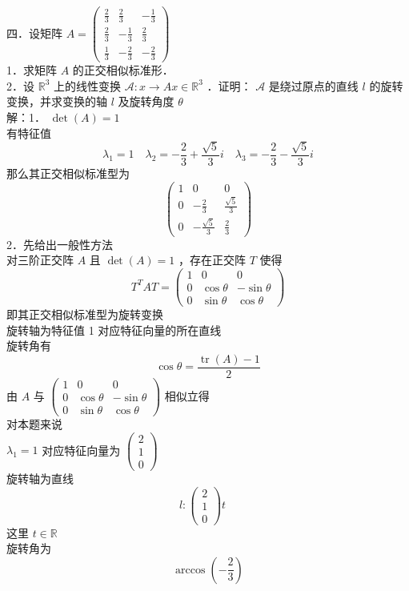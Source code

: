 \documentclass[UTF8]{ctexart}
\begin{document}
\noindent 四．设矩阵 $A=\left(\begin{array}{ccc}\frac{2}{3} & \frac{2}{3} & -\frac{1}{3} \\ \frac{2}{3} & -\frac{1}{3} & \frac{2}{3} \\ \frac{1}{3} & -\frac{2}{3} & -\frac{2}{3}\end{array}\right)$\\
1．求矩阵 $A$ 的正交相似标准形．\\
2．设 $\mathbb{R}^{3}$ 上的线性变换 $\mathcal{A}: x \rightarrow A x \in \mathbb{R}^{3}$ ．证明： $\mathcal{A}$ 是绕过原点的直线 $l$ 的旋转变换，并求变换的轴 $l$ 及旋转角度 $\theta$\\
解：1． $\operatorname{det}(A)=1$\\
有特征值 
$$\lambda_{1}=1 \quad \lambda_{2}=-\frac{2}{3}+\frac{\sqrt{5}}{3} i \quad \lambda_{3}=-\frac{2}{3}-\frac{\sqrt{5}}{3} i$$
那么其正交相似标准型为 $$\left(\begin{array}{ccc}1 & 0 & 0 \\ 0 & -\frac{2}{3} & \frac{\sqrt{5}}{3} \\ 0 & -\frac{\sqrt{5}}{3} & \frac{2}{3}\end{array}\right)$$
2．先给出一般性方法\\
对三阶正交阵 $A$ 且 $\operatorname{det}(A)=1$ ，存在正交阵 $T$ 使得
$$T^{T} A T=\left(\begin{array}{lll}1 & 0 & 0 \\ 0 & \cos \theta & -\sin \theta \\ 0 & \sin \theta & \cos \theta\end{array}\right)$$
即其正交相似标准型为旋转变换\\
旋转轴为特征值 1 对应特征向量的所在直线\\
旋转角有 
$$\cos \theta=\frac{\operatorname{tr}(A)-1}{2}$$
由 $A$ 与 $\left(\begin{array}{lll}1 & 0 & 0 \\ 0 & \cos \theta & -\sin \theta \\ 0 & \sin \theta & \cos \theta\end{array}\right)$ 相似立得\\
对本题来说\\
$\lambda_{1}=1$ 对应特征向量为 $\left(\begin{array}{l}2 \\ 1 \\ 0\end{array}\right)$\\
旋转轴为直线 $$l:\left(\begin{array}{l}2 \\ 1 \\ 0\end{array}\right) t \quad$$
这里 $t \in \mathbb{R}$\\
旋转角为 
$$\arccos \left(-\frac{2}{3}\right)$$\\
\end{document}
